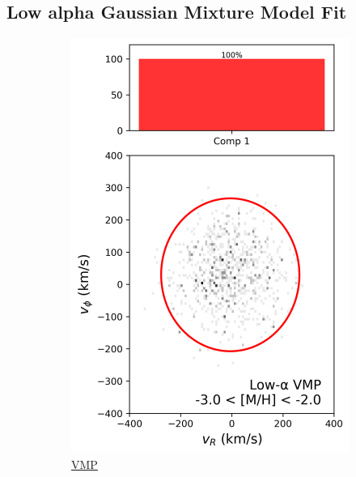 \documentclass[a4paper,12pt]{article}
\begin{document}
\subsection{Low alpha Gaussian Mixture Model Fit}

\begin{figure}[H]
  \centering
  \begin{subfigure}{0.24\linewidth}
    \centering
    \includegraphics[width=\linewidth]{../figures/gmm_vmp_low_alpha_k1.png}
    \caption{\href{https://raw.githack.com/raunaq-rai/Disentangling-the-Milky-Way-using-GMM/main/figures/VMP_low____-3\%5BM_H\%5D-2.html}{VMP}}
    \label{fig:gmm_vmp_lo}
  \end{subfigure}\hfill
  \begin{subfigure}{0.24\linewidth}
    \centering

\end{subfigure}
\end{figure}
\end{document}
